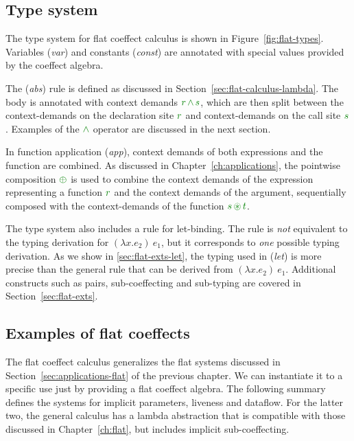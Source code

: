 
\subsection{Type system}
\label{sec:flat-calculus-types}

The type system for flat coeffect calculus is shown in Figure~\ref{fig:flat-types}. Variables
(\emph{var}) and constants (\emph{const}) are annotated with special values provided by the
coeffect algebra.

The (\emph{abs}) rule is defined as discussed in Section~\ref{sec:flat-calculus-lambda}. The
body is annotated with context demands $\cclrd{r} \,\czip\, \cclrd{s}$, which are then split
between the context-demands on the declaration site $\cclrd{r}$ and context-demands on
the call site $\cclrd{s}$. Examples of the $\czip$ operator are discussed in the next section.

In function application (\emph{app}), context demands of both expressions and the
function are combined. As discussed in Chapter~\ref{ch:applications}, the pointwise composition
$\cpar$ is used to combine the context demands of the expression representing a function
$\cclrd{r}$ and the context demands of the argument, sequentially composed with the
context-demands of the function $\cclrd{s}\, \cseq \,\cclrd{t}$.

The type system also includes a rule for let-binding. The rule is \emph{not} equivalent to the
typing derivation for $(\lambda x.e_2)~e_1$, but it corresponds to \emph{one} possible typing
derivation. As we show in \ref{sec:flat-exts-let}, the typing used in (\emph{let}) is more
precise than the general rule that can be derived from $(\lambda x.e_2)~e_1$. Additional
constructs such as pairs, sub-coeffecting and sub-typing are covered in Section~\ref{sec:flat-exts}.


\subsection{Examples of flat coeffects}
\label{sec:flat-calculus-examples}

The flat coeffect calculus generalizes the flat systems discussed in
Section~\ref{sec:applications-flat} of the previous chapter. We can instantiate it to a specific
use just by providing a flat coeffect algebra. The following summary defines the systems for implicit
parameters, liveness and dataflow. For the latter two, the general calculus has a lambda abstraction
that is compatible with those discussed in Chapter~\ref{ch:flat}, but includes implicit sub-coeffecting.

